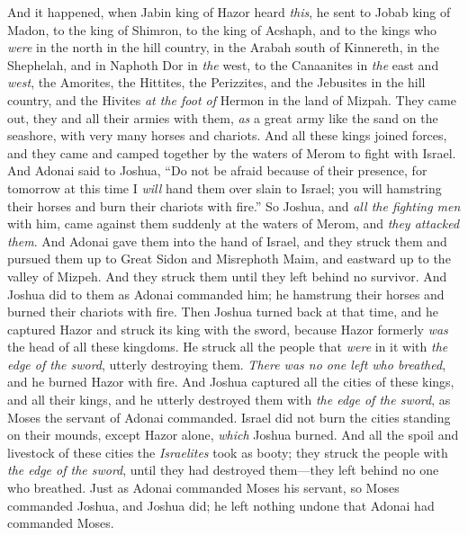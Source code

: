 \begin{biblechapter} %
 And it happened, when Jabin king of Hazor heard \textit{this}, he sent to Jobab king of Madon, to the king of Shimron, to the king of Acshaph,
\verse and to the kings who \textit{were} in the north in the hill country, in the Arabah south of Kinnereth, in the Shephelah, and in Naphoth Dor in \textit{the} west,
\verse to the Canaanites in \textit{the} east and \textit{west}, the Amorites, the Hittites, the Perizzites, and the Jebusites in the hill country, and the Hivites \textit{at the foot of} Hermon in the land of Mizpah.
\verse They came out, they and all their armies with them, \textit{as} a great army like the sand on the seashore, with very many horses and chariots.
\verse And all these kings joined forces, and they came and camped together by the waters of Merom to fight with Israel.
\verse And Adonai said to Joshua, “Do not be afraid because of their presence, for tomorrow at this time I \textit{will} hand them over slain to Israel; you will hamstring their horses and burn their chariots with fire.”
\verse So Joshua, and \textit{all the fighting men} with him, came against them suddenly at the waters of Merom, and \textit{they attacked them}.
\verse And Adonai gave them into the hand of Israel, and they struck them and pursued them up to Great Sidon and Misrephoth Maim, and eastward up to the valley of Mizpeh. And they struck them until they left behind no survivor.
\verse And Joshua did to them as Adonai commanded him; he hamstrung their horses and burned their chariots with fire.
\verse Then Joshua turned back at that time, and he captured Hazor and struck its king with the sword, because Hazor formerly \textit{was} the head of all these kingdoms.
\verse He struck all the people that \textit{were} in it with \textit{the edge of the sword}, utterly destroying them. \textit{There was no one left who breathed}, and he burned Hazor with fire.
\verse And Joshua captured all the cities of these kings, and all their kings, and he utterly destroyed them with \textit{the edge of the sword}, as Moses the servant of Adonai commanded.
\verse Israel did not burn the cities standing on their mounds, except Hazor alone, \textit{which} Joshua burned.
\verse And all the spoil and livestock of these cities the \textit{Israelites} took as booty; they struck the people with \textit{the edge of the sword}, until they had destroyed them—they left behind no one who breathed.
\verse Just as Adonai commanded Moses his servant, so Moses commanded Joshua, and Joshua did; he left nothing undone that Adonai had commanded Moses.

\end{biblechapter}
